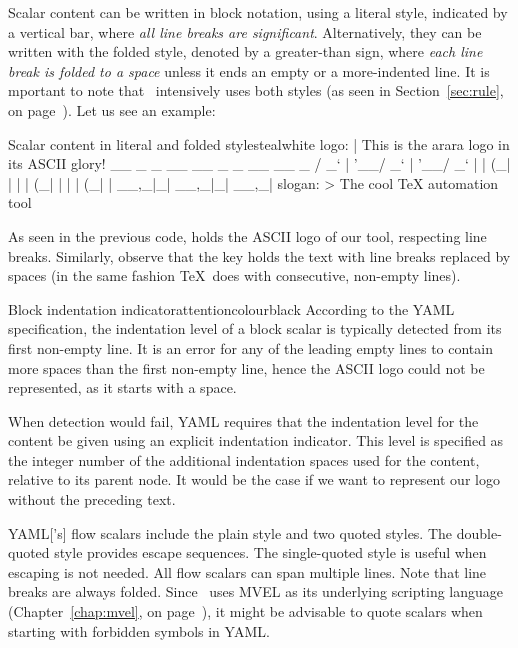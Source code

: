 Scalar content can be written in block notation, using a literal style, indicated by a vertical bar, where \emph{all line breaks are significant}. Alternatively, they can be written with the folded style, denoted by a greater-than sign, where \emph{each line break is folded to a space} unless it ends an empty or a more-indented line. It is mportant to note that \arara\ intensively uses both styles (as seen in Section~\ref{sec:rule}, on page~\pageref{sec:rule}). Let us see an example:

\begin{codebox}{Scalar content in literal and folded styles}{teal}{\icnote}{white}
logo: |
  This is the arara logo
  in its ASCII glory! 
    __ _ _ __ __ _ _ __ __ _ 
   / _` | '__/ _` | '__/ _` |
  | (_| | | | (_| | | | (_| |
   \__,_|_|  \__,_|_|  \__,_|
slogan: >
  The cool TeX
  automation tool
\end{codebox}

As seen in the previous code,  holds the ASCII logo of our tool, respecting line breaks. Similarly, observe that the  key holds the text with line breaks replaced by spaces (in the same fashion \TeX\ does with consecutive, non-empty lines).

\begin{messagebox}{Block indentation indicator}{attentioncolour}{\icattention}{black}
\setlength{\parskip}{1em}
According to the \gls{YAML} specification, the indentation level of a block scalar is typically detected from its first non-empty line. It is an error for any of the leading empty lines to contain more spaces than the first non-empty line, hence the ASCII logo could not be represented, as it starts with a space.

When detection would fail, \gls{YAML} requires that the indentation level for the content be given using an explicit indentation indicator. This level is specified as the integer number of the additional indentation spaces used for the content, relative to its parent node. It would be the case if we want to represent our logo without the preceding text.
\end{messagebox}

\gls{YAML}['s] flow scalars include the plain style and two quoted styles. The double-quoted style provides escape sequences. The single-quoted style is useful when escaping is not needed. All flow scalars can span multiple lines. Note that line breaks are always folded. Since \arara\ uses \gls{MVEL} as its underlying scripting language (Chapter~\ref{chap:mvel}, on page~\pageref{chap:mvel}), it might be advisable to quote scalars when starting with forbidden symbols in \gls{YAML}.

